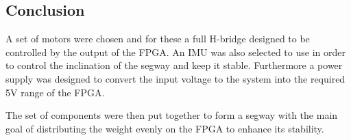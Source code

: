
\subsection{Conclusion}
A set of motors were chosen and for these a full H-bridge designed to be controlled by the output of the FPGA.
An IMU was also selected to use in order to control the inclination of the segway and keep it stable.
Furthermore a power supply was designed to convert the input voltage to the system into the required 5V range of the FPGA.

The set of components were then put together to form a segway with the main goal of distributing the weight evenly on the FPGA to  enhance its stability.